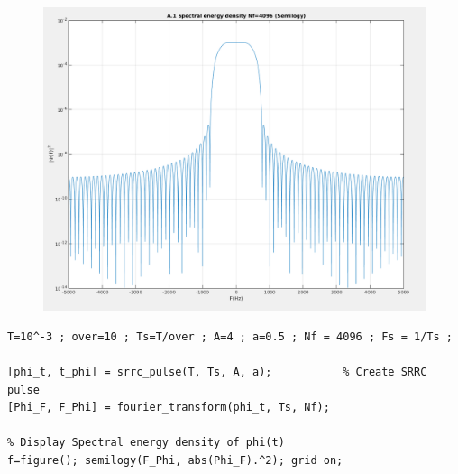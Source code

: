 \documentclass[11pt]{article}
\begin{document}
    \begin{figure}[H]
        \centering
        \includegraphics[scale=0.5, width=\textwidth]{photos/A.1 Spectral energy density.png} \\
    \end{figure}
    
    \begin{lstlisting}[caption = {A.1 Create SRRC pulse and display SED}]
T=10^-3 ; over=10 ; Ts=T/over ; A=4 ; a=0.5 ; Nf = 4096 ; Fs = 1/Ts ; 

[phi_t, t_phi] = srrc_pulse(T, Ts, A, a);           % Create SRRC pulse  
[Phi_F, F_Phi] = fourier_transform(phi_t, Ts, Nf);

% Display Spectral energy density of phi(t)
f=figure(); semilogy(F_Phi, abs(Phi_F).^2); grid on; 
    \end{lstlisting}

\end{document}
